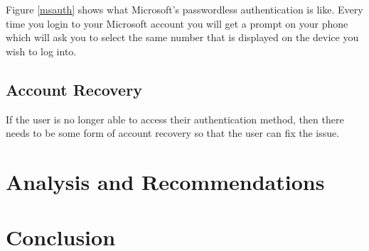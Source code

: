 \documentclass[12pt, letterpaper]{article}
\begin{document}
Figure \ref{msauth} shows what Microsoft's passwordless authentication is like.
Every time you login to your Microsoft account you will get a prompt on your phone which will ask you to select the same number that is displayed on the device you wish to log into.

\subsection{Account Recovery}
If the user is no longer able to access their authentication method, then there needs to be some form of account recovery so that the user can fix the issue.

\newpage
\section{Analysis and Recommendations}

\newpage
\section{Conclusion}

\printbibliography
\end{document}
